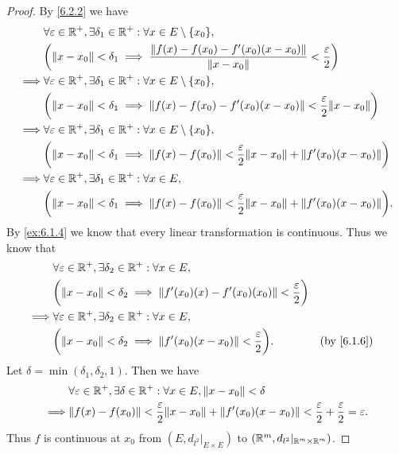 \begin{proof}
  By \cref{6.2.2} we have
  \begin{align*}
             & \forall \varepsilon \in \R^+, \exists \delta_1 \in \R^+ : \forall x \in E \setminus \set{x_0},                                             \\
             & \bigg(\norm*{x - x_0} < \delta_1 \implies \dfrac{\norm*{f(x) - f(x_0) - f'(x_0)(x - x_0)}}{\norm*{x - x_0}} < \dfrac{\varepsilon}{2}\bigg) \\
    \implies & \forall \varepsilon \in \R^+, \exists \delta_1 \in \R^+ : \forall x \in E \setminus \set{x_0},                                             \\
             & \bigg(\norm*{x - x_0} < \delta_1 \implies \norm*{f(x) - f(x_0) - f'(x_0)(x - x_0)} < \dfrac{\varepsilon}{2} \norm*{x - x_0}\bigg)          \\
    \implies & \forall \varepsilon \in \R^+, \exists \delta_1 \in \R^+ : \forall x \in E \setminus \set{x_0},                                             \\
             & \bigg(\norm*{x - x_0} < \delta_1 \implies \norm*{f(x) - f(x_0)} < \dfrac{\varepsilon}{2} \norm*{x - x_0} + \norm*{f'(x_0)(x - x_0)}\bigg)  \\
    \implies & \forall \varepsilon \in \R^+, \exists \delta_1 \in \R^+ : \forall x \in E,                                                                 \\
             & \bigg(\norm*{x - x_0} < \delta_1 \implies \norm*{f(x) - f(x_0)} < \dfrac{\varepsilon}{2} \norm*{x - x_0} + \norm*{f'(x_0)(x - x_0)}\bigg).
  \end{align*}
  By \cref{ex:6.1.4} we know that every linear transformation is continuous.
  Thus we know that
  \begin{align*}
             & \forall \varepsilon \in \R^+, \exists \delta_2 \in \R^+ : \forall x \in E,                                                 \\
             & \bigg(\norm*{x - x_0} < \delta_2 \implies \norm*{f'(x_0)(x) - f'(x_0)(x_0)} < \dfrac{\varepsilon}{2}\bigg)                 \\
    \implies & \forall \varepsilon \in \R^+, \exists \delta_2 \in \R^+ : \forall x \in E,                                                 \\
             & \bigg(\norm*{x - x_0} < \delta_2 \implies \norm*{f'(x_0)(x - x_0)} < \dfrac{\varepsilon}{2}\bigg).         &  & \by{6.1.6}
  \end{align*}
  Let \(\delta = \min(\delta_1, \delta_2, 1)\).
  Then we have
  \begin{align*}
             & \forall \varepsilon \in \R^+, \exists \delta \in \R^+ : \forall x \in E, \norm*{x - x_0} < \delta                                                          \\
    \implies & \norm*{f(x) - f(x_0)} < \dfrac{\varepsilon}{2} \norm*{x - x_0} + \norm*{f'(x_0)(x - x_0)} < \dfrac{\varepsilon}{2} + \dfrac{\varepsilon}{2} = \varepsilon.
  \end{align*}
  Thus \(f\) is continuous at \(x_0\) from \((E, d_{l^2}|_{E \times E})\) to \((\mathbb{R}^m, d_{l^2}|_{\mathbb{R}^m \times \mathbb{R}^m})\).
\end{proof}

